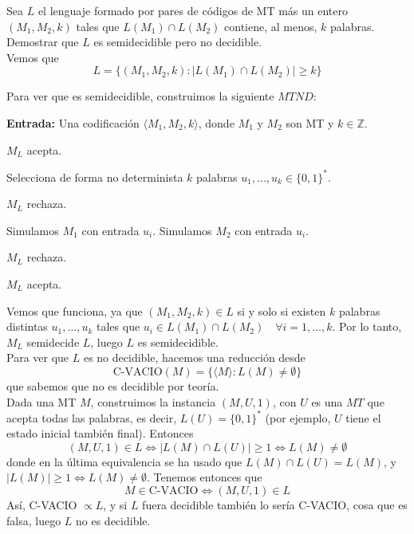 \begin{ejercicio}
    Sea $L$ el lenguaje formado por pares de códigos de MT más un entero $(M_1 ,M_2 , k)$ tales que 
    $L(M_1) \cap L(M_2)$ contiene, al menos, $k$ palabras. Demostrar que $L$ es semidecidible pero no decidible. \\

    Vemos que $$L = \{(M_1, M_2, k) : |L(M_1) \cap L(M_2)| \geq k\}$$

    Para ver que es semidecidible, construimos la siguiente $MTND$:

    \begin{algorithm}
        \caption{MTND $M_L$}
        \label{algorithm:L-semidecidible}
        \begin{algorithmic}
            \State \textbf{Entrada:} Una codificación $\langle M_1,M_2,k\rangle$, donde $M_1$ y $M_2$ son MT y $k\in\mathbb{Z}$.

                \State $M_L$ acepta.
            \EndIf

            \State Selecciona de forma no determinista $k$ palabras $u_1,\dots,u_k \in \{0,1\}^{*}$.

                \State $M_L$ rechaza.
            \EndIf

                \State Simulamos $M_1$ con entrada $u_i$.
                \State Simulamos $M_2$ con entrada $u_i$.

                    \State $M_L$ rechaza.
                \EndIf
            \EndFor

                \State $M_L$ acepta.
            \EndIf
        \end{algorithmic}
    \end{algorithm}

    Vemos que funciona, ya que $(M_1, M_2, k) \in L$ si y solo si existen $k$ palabras distintas $u_1, \ldots, u_k$ tales
    que $u_i \in L(M_1) \cap L(M_2) \quad \forall i = 1, \ldots, k$. Por lo tanto, $M_L$ semidecide $L$, luego 
    $L$ es semidecidible. \\

    Para ver que $L$ es no decidible, hacemos una reducción desde 
    $$\text{C-VACIO}(M) = \{\langle M \rangle : L(M) \neq \emptyset\}$$
    que sabemos que no es decidible por teoría. \\

    Dada una MT $M$, construimos la instancia $(M, U, 1)$, con $U$ es una $MT$ que acepta todas las palabras, es decir,
    $L(U) = \{0,1\}^{*}$ (por ejemplo, $U$ tiene el estado inicial también final). Entonces 
    $$(M,U,1) \in L \iff |L(M) \cap L(U)| \geq 1 \iff L(M) \neq \emptyset$$
    donde en la última equivalencia se ha usado que $L(M) \cap L(U) = L(M)$, y $|L(M)| \geq 1 \iff L(M) \neq \emptyset$. 
    Tenemos entonces que $$M \in \text{C-VACIO} \iff (M,U,1) \in L$$
    Así, C-VACIO $\propto L$, y si $L$ fuera decidible también lo sería C-VACIO, cosa que es falsa, luego $L$ no es decidible.
\end{ejercicio}



